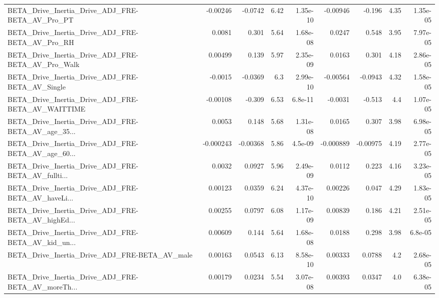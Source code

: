 \begin{tabular}{lrrrrrrrr}
BETA\_Drive\_Inertia\_Drive\_ADJ\_FRE-BETA\_AV\_Pro\_PT    &    -0.00246 &      -0.0742 &     6.42 & 1.35e-10 &   -0.00946 &      -0.196 &         4.35 &      1.35e-05 \\
BETA\_Drive\_Inertia\_Drive\_ADJ\_FRE-BETA\_AV\_Pro\_RH    &      0.0081 &        0.301 &     5.64 & 1.68e-08 &     0.0247 &       0.548 &         3.95 &      7.97e-05 \\
BETA\_Drive\_Inertia\_Drive\_ADJ\_FRE-BETA\_AV\_Pro\_Walk  &     0.00499 &        0.139 &     5.97 & 2.35e-09 &     0.0163 &       0.301 &         4.18 &      2.86e-05 \\
BETA\_Drive\_Inertia\_Drive\_ADJ\_FRE-BETA\_AV\_Single    &     -0.0015 &      -0.0369 &      6.3 & 2.99e-10 &   -0.00564 &     -0.0943 &         4.32 &      1.58e-05 \\
BETA\_Drive\_Inertia\_Drive\_ADJ\_FRE-BETA\_AV\_WAITTIME  &    -0.00108 &       -0.309 &     6.53 &  6.8e-11 &    -0.0031 &      -0.513 &          4.4 &      1.07e-05 \\
BETA\_Drive\_Inertia\_Drive\_ADJ\_FRE-BETA\_AV\_age\_35... &      0.0053 &        0.148 &     5.68 & 1.31e-08 &     0.0165 &       0.307 &         3.98 &      6.98e-05 \\
BETA\_Drive\_Inertia\_Drive\_ADJ\_FRE-BETA\_AV\_age\_60... &   -0.000243 &     -0.00368 &     5.86 &  4.5e-09 &  -0.000889 &    -0.00975 &         4.19 &      2.77e-05 \\
BETA\_Drive\_Inertia\_Drive\_ADJ\_FRE-BETA\_AV\_fullti... &      0.0032 &       0.0927 &     5.96 & 2.49e-09 &     0.0112 &       0.223 &         4.16 &      3.23e-05 \\
BETA\_Drive\_Inertia\_Drive\_ADJ\_FRE-BETA\_AV\_haveLi... &     0.00123 &       0.0359 &     6.24 & 4.37e-10 &    0.00226 &       0.047 &         4.29 &      1.83e-05 \\
BETA\_Drive\_Inertia\_Drive\_ADJ\_FRE-BETA\_AV\_highEd... &     0.00255 &       0.0797 &     6.08 & 1.17e-09 &    0.00839 &       0.186 &         4.21 &      2.51e-05 \\
BETA\_Drive\_Inertia\_Drive\_ADJ\_FRE-BETA\_AV\_kid\_un... &     0.00609 &        0.144 &     5.64 & 1.68e-08 &     0.0188 &       0.298 &         3.98 &       6.8e-05 \\
BETA\_Drive\_Inertia\_Drive\_ADJ\_FRE-BETA\_AV\_male      &     0.00163 &       0.0543 &     6.13 & 8.58e-10 &    0.00333 &      0.0788 &          4.2 &      2.68e-05 \\
BETA\_Drive\_Inertia\_Drive\_ADJ\_FRE-BETA\_AV\_moreTh... &     0.00179 &       0.0234 &     5.54 & 3.07e-08 &    0.00393 &      0.0347 &          4.0 &      6.38e-05 \\

\end{tabular}
